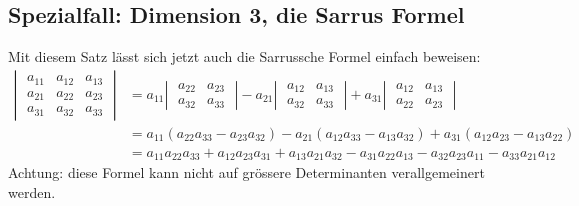 \subsection{Spezialfall: Dimension 3, die Sarrus Formel}
Mit diesem Satz lässt sich jetzt auch die Sarrussche Formel einfach beweisen:
\begin{align*}
\left|\;
\begin{matrix}
a_{11}&a_{12}&a_{13}\\
a_{21}&a_{22}&a_{23}\\
a_{31}&a_{32}&a_{33}
\end{matrix}\;\right|
&=
a_{11}
\left|\;\begin{matrix}
a_{22}&a_{23}\\
a_{32}&a_{33}
\end{matrix}\;\right|
-
a_{21}
\left|\;\begin{matrix}
a_{12}&a_{13}\\
a_{32}&a_{33}
\end{matrix}\;\right|
+
a_{31}
\left|\;\begin{matrix}
a_{12}&a_{13}\\
a_{22}&a_{23}
\end{matrix}\;\right|
\\
&=a_{11}(a_{22}a_{33}-a_{23}a_{32})
-a_{21}(a_{12}a_{33}-a_{13}a_{32})
+a_{31}(a_{12}a_{23}-a_{13}a_{22})
\\
&=
a_{11}a_{22}a_{33}+a_{12}a_{23}a_{31}+a_{13}a_{21}a_{32}
-a_{31}a_{22}a_{13}-a_{32}a_{23}a_{11}-a_{33}a_{21}a_{12}
\end{align*}
Achtung: diese Formel kann nicht auf grössere Determinanten
verallgemeinert werden.


